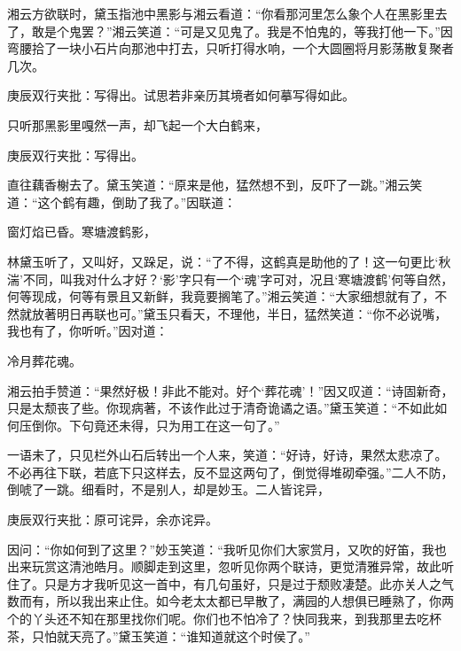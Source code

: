\begin{parag}
    湘云方欲联时，黛玉指池中黑影与湘云看道：“你看那河里怎么象个人在黑影里去了，敢是个鬼罢？”湘云笑道：“可是又见鬼了。我是不怕鬼的，等我打他一下。”因弯腰拾了一块小石片向那池中打去，只听打得水响，一个大圆圈将月影荡散复聚者几次。\begin{note}庚辰双行夹批：写得出。试思若非亲历其境者如何摹写得如此。\end{note}只听那黑影里嘎然一声，却飞起一个大白鹤来，\begin{note}庚辰双行夹批：写得出。\end{note}直往藕香榭去了。黛玉笑道：“原来是他，猛然想不到，反吓了一跳。”湘云笑道：“这个鹤有趣，倒助了我了。”因联道：
\end{parag}


\begin{poem}
    \begin{pl}

        窗灯焰已昏。寒塘渡鹤影，

    \end{pl}
\end{poem}


\begin{parag}
    林黛玉听了，又叫好，又跺足，说：“了不得，这鹤真是助他的了！这一句更比‘秋湍’不同，叫我对什么才好？‘影’字只有一个‘魂’字可对，况且‘寒塘渡鹤’何等自然，何等现成，何等有景且又新鲜，我竟要搁笔了。”湘云笑道：“大家细想就有了，不然就放著明日再联也可。”黛玉只看天，不理他，半日，猛然笑道：“你不必说嘴，我也有了，你听听。”因对道：
\end{parag}


\begin{poem}
    \begin{pl}
        冷月葬花魂。
    \end{pl}
\end{poem}


\begin{parag}
    湘云拍手赞道：“果然好极！非此不能对。好个‘葬花魂’！”因又叹道：“诗固新奇，只是太颓丧了些。你现病著，不该作此过于清奇诡谲之语。”黛玉笑道：“不如此如何压倒你。下句竟还未得，只为用工在这一句了。”
\end{parag}


\begin{parag}
    一语未了，只见栏外山石后转出一个人来，笑道：“好诗，好诗，果然太悲凉了。不必再往下联，若底下只这样去，反不显这两句了，倒觉得堆砌牵强。”二人不防，倒唬了一跳。细看时，不是别人，却是妙玉。二人皆诧异，\begin{note}庚辰双行夹批：原可诧异，余亦诧异。\end{note}因问：“你如何到了这里？”妙玉笑道：“我听见你们大家赏月，又吹的好笛，我也出来玩赏这清池皓月。顺脚走到这里，忽听见你两个联诗，更觉清雅异常，故此听住了。只是方才我听见这一首中，有几句虽好，只是过于颓败凄楚。此亦关人之气数而有，所以我出来止住。如今老太太都已早散了，满园的人想俱已睡熟了，你两个的丫头还不知在那里找你们呢。你们也不怕冷了？快同我来，到我那里去吃杯茶，只怕就天亮了。”黛玉笑道：“谁知道就这个时侯了。”
\end{parag}


